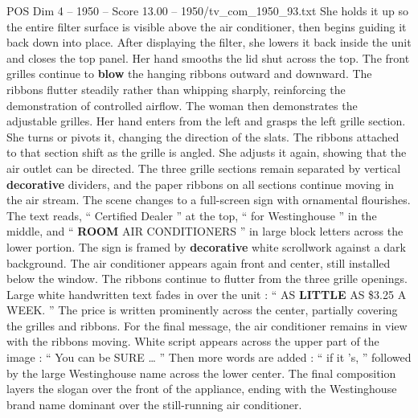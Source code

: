 \begin{textsample}{POS Dim 4 – 1950 – Score 13.00 – 1950/tv\_com\_1950\_93.txt}
She holds it up so the entire filter surface is visible above the air conditioner, then begins guiding it back down into place.
After displaying the filter, she lowers it back inside the unit and closes the top panel.
Her hand smooths the lid shut across the top.
The front grilles continue to \textbf{blow} the hanging ribbons outward and downward.
The ribbons flutter steadily rather than whipping sharply, reinforcing the demonstration of controlled airflow.
The woman then demonstrates the adjustable grilles.
Her hand enters from the left and grasps the left grille section.
She turns or pivots it, changing the direction of the slats.
The ribbons attached to that section shift as the grille is angled.
She adjusts it again, showing that the air outlet can be directed.
The three grille sections remain separated by vertical \textbf{decorative} dividers, and the paper ribbons on all sections continue moving in the air stream.
The scene changes to a full-screen sign with ornamental flourishes.
The text reads, “ Certified Dealer ” at the top, “ for Westinghouse ” in the middle, and “ \textbf{ROOM} AIR CONDITIONERS ” in large block letters across the lower portion.
The sign is framed by \textbf{decorative} white scrollwork against a dark background.
The air conditioner appears again front and center, still installed below the window.
The ribbons continue to flutter from the three grille openings.
Large white handwritten text fades in over the unit : “ AS \textbf{LITTLE} AS \$3.25 A WEEK. ” The price is written prominently across the center, partially covering the grilles and ribbons.
For the final message, the air conditioner remains in view with the ribbons moving.
White script appears across the upper part of the image : “ You can be SURE … ” Then more words are added : “ if it ’s, ” followed by the large Westinghouse name across the lower center.
The final composition layers the slogan over the front of the appliance, ending with the Westinghouse brand name dominant over the still-running air conditioner.

\end{textsample}
